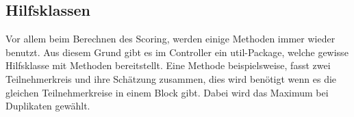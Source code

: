 \subsection{Hilfsklassen}
Vor allem beim Berechnen des Scoring, werden einige Methoden immer
wieder benutzt.
Aus diesem Grund gibt es im Controller ein util-Package,
welche gewisse Hilfsklasse mit Methoden bereitstellt.
Eine Methode beispielsweise, fasst zwei Teilnehmerkreis und ihre Schätzung zusammen, dies wird benötigt
wenn es die gleichen Teilnehmerkreise in einem Block gibt.
Dabei wird das Maximum bei Duplikaten gewählt.